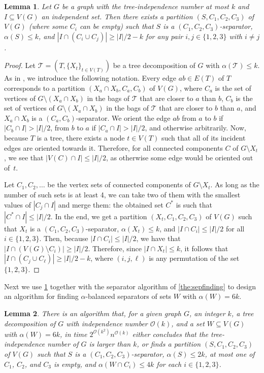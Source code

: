 \documentclass[11pt]{article}
\newtheorem{lemma}{Lemma}[section]
\theoremstyle{definition}
\newcommand{\td}{\mathcal{T}}
\newcommand{\OO}{\mathcal{O}}
\begin{document}
\begin{lemma}
\label{lem:sep_exist}
Let $G$ be a graph with the tree-independence number at most $k$ and $I \subseteq V(G)$ an independent set.
Then there exists a partition $(S, C_1, C_2, C_3)$ of $V(G)$ (where some $C_i$ can be empty) such that $S$ is a $(C_1, C_2, C_3)$-separator, $\alpha(S) \le k$, and $|I \cap (C_i \cup C_j)| \ge |I|/2-k$ for any pair $i,j \in \{1,2,3\}$ with $i \neq j$.
\end{lemma}
\begin{proof}
Let $\td = (T, \{X_t\}_{t \in V(T)})$ be a tree decomposition of $G$ with $\alpha(\td)\le k$.
As in , we introduce the following notation.
Every edge $ab \in E(T)$ of $T$ corresponds to a partition $(X_a \cap X_b, C_a, C_b)$ of $V(G)$, where $C_a$ is the set of vertices of $G \setminus (X_a \cap X_b)$ in the bags of $\td$ that are closer to $a$ than $b$, $C_b$ is the set of vertices of $G \setminus (X_a \cap X_b)$ in the bags of $\td$ that are closer to $b$ than $a$, and $X_a \cap X_b$ is a $(C_a, C_b)$-separator.
We orient the edge $ab$ from $a$ to $b$ if $|C_b \cap I| > |I|/2$, from $b$ to $a$ if $|C_a \cap I| > |I|/2$, and otherwise arbitrarily.
Now, because $T$ is a tree, there exists a node $t \in V(T)$ such that all of its incident edges are oriented towards it.
Therefore, for all connected components $C$ of $G \setminus X_t$, we see that $|V(C)\cap I| \le |I|/2$, as otherwise some edge would be oriented out of~$t$.

Let $C_1, C_2, \dots$ be the vertex sets of connected components of $G \setminus X_t$.
As long as the number of such sets is at least 4, we can take two of them with the smallest values of $|C_j \cap I|$ and merge them: the obtained set $C^*$ is such that $|C^* \cap I| \leq |I|/2$.
In the end, we get a partition $(X_t, C_1, C_2, C_3)$ of $V(G)$ such that $X_t$ is a $(C_1,C_2,C_3)$-separator, $\alpha(X_t) \le k$, and $|I \cap C_i| \le |I|/2$ for all $i \in \{1,2,3\}$.
Then, because $|I \cap C_i| \le |I|/2$, we have that  $|I \cap (V(G) \setminus C_i)| \ge |I|/2$.
Therefore, since $|I \cap X_t| \le k$, it follows that $|I \cap (C_j \cup C_\ell)| \ge |I|/2-k$, where $(i,j,\ell)$ is any permutation of the set $\{1,2,3\}$.
\end{proof}

Next we use \cref{lem:sep_exist} together with the separator algorithm of \cref{the:sepfinding} to design an algorithm for finding $\alpha$-balanced separators of sets $W$ with $\alpha(W) = 6k$.

\begin{lemma}
\label{lem:decomp_sepfind}
There is an algorithm that, for a given graph $G$, an integer $k$, a tree decomposition of $G$ with independence number $\OO(k)$, and a set $W \subseteq V(G)$ with $\alpha(W) = 6k$, in time $2^{\OO(k^2)} n^{\OO(k)}$ either concludes that the tree-independence number of $G$ is larger than $k$, or finds a partition $(S, C_1, C_2, C_3)$ of $V(G)$ such that $S$ is a $(C_1,C_2,C_3)$-separator, $\alpha(S) \le 2k$, at most one of $C_1$, $C_2$, and $C_3$ is empty, and $\alpha(W \cap C_i) \le 4k$ for each $i \in \{1,2,3\}$.
\end{lemma}
\end{document}

